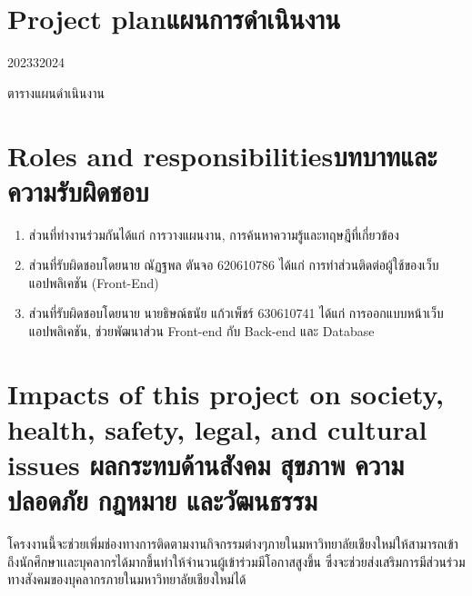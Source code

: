 \section{\ifenglish Project plan\else แผนการดำเนินงาน\fi}

\begin{plan}{10}{2023}{3}{2024}

    \caption{ตารางแผนดำเนินงาน}
\end{plan}

\section{\ifenglish Roles and responsibilities\else บทบาทและความรับผิดชอบ\fi}
\begin{enumerate}
    \item ส่วนที่ทำงานร่วมกันได้แก่ การวางแผนงาน, การค้นหาความรู้และทฤษฎีที่เกี่ยวข้อง
    \item ส่วนที่รับผิดชอบโดยนาย ณัฏฐพล ตันจอ 620610786 ได้แก่ การทำส่วนติดต่อผู้ใช้ของเว็บแอปพลิเคชัน (Front-End)
    \item ส่วนที่รับผิดชอบโดยนาย นายธิษณ์ธนัย แก้วเพ็ชร์ 630610741 ได้แก่ การออกแบบหน้าเว็บแอปพลิเคชัน, ช่วยพัฒนาส่วน Front-end กับ Back-end และ Database 
\end{enumerate}

\section{\ifenglish%
Impacts of this project on society, health, safety, legal, and cultural issues
\else%
ผลกระทบด้านสังคม สุขภาพ ความปลอดภัย กฎหมาย และวัฒนธรรม
\fi}

โครงงานนี้จะช่วยเพิ่มช่องทางการติดตามงานกิจกรรมต่างๆภายในมหาวิทยาลัยเชียงใหม่ให้สามารถเข้าถึงนักศึกษาเเละบุคลากรได้มากขึ้นทำให้จำนวนผู้เข้าร่วมมีโอกาสสูงขึ้น ซึ่งจะช่วยส่งเสริมการมีส่วนร่วมทางสังคมของบุคลากรภายในมหาวิทยาลัยเชียงใหม่ได้